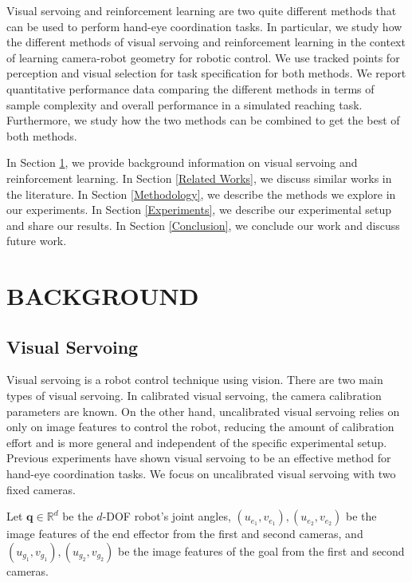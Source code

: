 \documentclass[letterpaper, 10 pt, conference]{ieeeconf}  %
\begin{document}
Visual servoing and reinforcement learning are two quite different methods that can be
used to perform hand-eye coordination tasks. In particular, we study how the different
methods of visual servoing and reinforcement learning in the context of learning
camera-robot geometry for robotic control. We use tracked points for perception and
visual selection for task specification for both methods. We report quantitative
performance data comparing the different methods in terms of sample complexity and
overall performance in a simulated reaching task. Furthermore, we study how the two
methods can be combined to get the best of both methods.

In Section \ref{Background}, we provide background information on visual
servoing and reinforcement learning. In Section \ref{Related Works}, we discuss
similar works in the literature. In Section \ref{Methodology}, we describe
the methods we explore in our experiments. In Section \ref{Experiments}, we
describe our experimental setup and share our results. In Section
\ref{Conclusion}, we conclude our work and discuss future work.

\section{BACKGROUND} \label{Background}

\subsection{Visual Servoing}

Visual servoing is a robot control technique using vision. There are
two main types of visual servoing. In calibrated visual servoing, the camera
calibration parameters are known. \cite{Chaumette2006} On the other hand, uncalibrated visual
servoing relies on only on image features to control the robot, reducing the
amount of calibration effort and is more general
and independent of the specific experimental setup.
Previous experiments have shown visual servoing to be an effective method for
\cite{Jagersand1997} hand-eye coordination tasks. We focus on uncalibrated
visual servoing with two fixed cameras.

Let $\mathbf{q} \in \mathbb{R}^d$ be
the $d$-DOF robot's joint angles, $(u_{e_1}, v_{e_1}), (u_{e_2}, v_{e_2})$ be the image features of the end
effector from the first and second cameras, and $(u_{g_1}, v_{g_1}), (u_{g_2}, v_{g_2})$ be the image
features of the goal from the first and second cameras.
\end{document}
